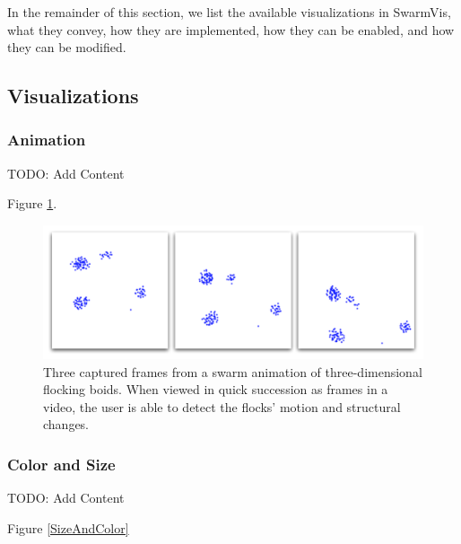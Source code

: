\documentclass[conference]{IEEEtran}
\begin{document}
In the remainder of this section, we list the available visualizations in SwarmVis, what they convey, how they are implemented,
how they can be enabled, and how they can be modified.


\subsection{Visualizations}
\subsubsection{Animation}

TODO: Add Content

Figure \ref{Animation}.

\begin{figure}
\centering
\includegraphics[scale=.282]{images/animation.pdf}
\caption{
Three captured frames from a swarm animation of three-dimensional flocking boids\cite{reynolds1987}.
When viewed in quick succession as frames in a video, the user
is able to detect the flocks' motion and structural changes.}
\label{Animation}
\end{figure}

\subsubsection{Color and Size}

TODO: Add Content

Figure \ref{SizeAndColor}
\end{document}

